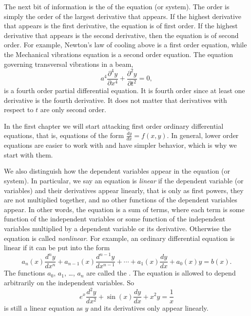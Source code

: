 \medskip

The next bit of information is the \emph{} of the
equation (or system).  The order is simply the order of the largest
derivative that appears.  If the highest derivative that appears is
the first derivative, the equation is of first order.  If the highest
derivative that appears is the second derivative, then the equation is of second
order.  For example, Newton's law of cooling above is a first order
equation, while the Mechanical vibrations equation is a second order equation.
The equation governing transversal vibrations in a beam,
\begin{equation*}
a^4 \frac{\partial^4 y}{\partial x^4} + \frac{\partial^2 y}{\partial t^2} = 0,
\end{equation*}
is a fourth order partial differential equation.  It is
fourth order since at least one derivative is the fourth derivative.  It
does not matter that derivatives with respect to $t$ are only second order.

In the first chapter we will start attacking first order ordinary
differential equations, that is, equations of the form $\frac{dy}{dx} = f(x,y)$.
In general, lower order equations are easier to work with and have simpler
behavior, which is why we start with them.

\medskip

We also distinguish how the dependent variables appear in the equation (or
system).  In particular, we say an equation is
\emph{linear} if the
dependent variable (or variables) and their derivatives appear linearly,
that is only as first powers, they are not multiplied together, and no other functions of the dependent
variables appear.  In other words, the equation is a sum of terms,
where each term is
some function of the independent variables
or 
some function of the independent variables
multiplied by a dependent variable
or its derivative.
Otherwise the equation is called
\emph{nonlinear}.
For example,
an ordinary differential equation is linear if it can be
put into the form
\begin{equation} \label{classification:eqlingen}
a_n(x) \frac{d^n y}{dx^n} + 
a_{n-1}(x) \frac{d^{n-1} y}{dx^{n-1}} + 
\cdots
+
a_{1}(x) \frac{dy}{dx}
+
a_{0}(x) y = b(x) .
\end{equation}
The functions $a_0$, $a_1$, \ldots, $a_n$ are called the
\emph{}.
The equation is allowed to depend arbitrarily on the independent variables.
So 
\begin{equation} \label{classification:eqlinex}
e^x \frac{d^2 y}{dx^2} + 
\sin(x) \frac{d y}{dx} + 
x^2 y
=
\frac{1}{x}
\end{equation}
is still a linear equation as $y$ and its derivatives only appear linearly.


